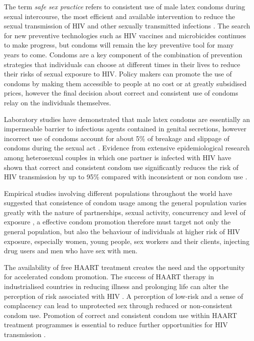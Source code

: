 The term \emph{safe sex practice} refers to consistent use of male latex condoms during
sexual intercourse, the most efficient and available intervention to reduce the sexual
transmission of HIV and other sexually transmitted infections \cite{WHO1998a}. The search
for new preventive technologies such as HIV vaccines and microbicides continues to make
progress, but condoms will remain the key preventive tool for many years to come. Condoms
are a key component of the combination of prevention strategies that individuals can
choose at different times in their lives to reduce their risks of sexual exposure to HIV.
Policy makers can promote the use of condoms by making them accessible to people at no
cost or at greatly subsidised prices, however the final decision about correct and
consistent use of condoms relay on the individuals themselves.

Laboratory studies have demonstrated that male latex condoms are essentially an
impermeable barrier to infectious agents contained in genital secretions, however
incorrect use of condoms account for about 5\% of breakage and slippage of condoms during
the sexual act \cite{Carey1999}. Evidence from extensive epidemiological research among
heterosexual couples in which one partner is infected with HIV have shown that correct
and consistent condom use significantly reduces the risk of HIV transmission by up to
95\% compared with inconsistent or non condom use \cite{Vincenzi1994, Ahmed2001,
Holmes2004}.

Empirical studies involving different populations throughout the world have suggested
that consistence of condom usage among the general population varies greatly with the
nature of partnerships, sexual activity, concurrency and level of exposure
\cite{Macaluso2000, Johnson2001,Wellings2001,Wong2004,Shlay2004}, a effective condom
promotion therefore must target not only the general population, but also the behaviour
of individuals at higher risk of HIV exposure, especially women, young people, sex
workers and their clients, injecting drug users and men who have sex with men.

The availability of free HAART treatment creates the need and the opportunity for
accelerated condom promotion. The success of HAART therapy in industrialised countries in
reducing illness and prolonging life can alter the perception of risk associated with HIV
\cite{Gremy2004}. A perception of low-risk and a sense of complacency can lead to
unprotected sex through reduced or non-consistent condom use. Promotion of correct and
consistent condom use within HAART treatment programmes is essential to reduce further
opportunities for HIV transmission \cite{Holmes2004}.

